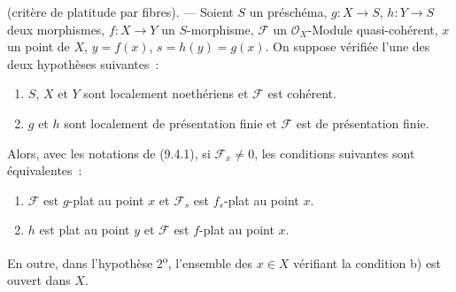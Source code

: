 \begin{theorem}[11.3.10]
\label{IV.11.3.10-fr}
(critère de platitude par fibres). --- Soient $S$ un préschéma,
$g:X\to S$, $h:Y\to S$ deux morphismes, $f:X\to Y$ un $S$-morphisme,
$\mathcal F$ un $\mathcal O_X$-Module quasi-cohérent, $x$ un point de $X$,
$y=f(x)$, $s=h(y)=g(x)$. On suppose vérifiée l'une des deux hypothèses
suivantes~:
\begin{enumerate}[label=\arabic{enumi}\textsuperscript{o}]
\item $S$, $X$ et $Y$ sont localement noethériens et $\mathcal F$ est cohérent.
\item $g$ et $h$ sont localement de présentation finie et $\mathcal F$ est de
présentation finie.
\end{enumerate}
Alors, avec les notations de (9.4.1), si $\mathcal F_x\neq0$, les conditions
suivantes sont équivalentes~:
\begin{enumerate}[label=\emph{\alph*)}]
\item $\mathcal F$ est $g$-plat au point $x$ et $\mathcal F_s$ est $f_s$-plat
au point $x$.
\item $h$ est plat au point $y$ et $\mathcal F$ est $f$-plat au point $x$.
\end{enumerate}
En outre, dans l'hypothèse 2\textsuperscript{o}, l'ensemble des $x\in X$
vérifiant la condition b) est ouvert dans $X$.
\end{theorem}

